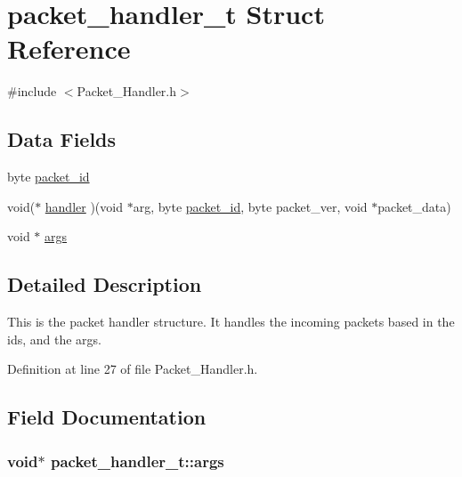 \hypertarget{structpacket__handler__t}{\section{packet\-\_\-handler\-\_\-t Struct Reference}
\label{structpacket__handler__t}
}


{\ttfamily \#include $<$Packet\-\_\-\-Handler.\-h$>$}

\subsection*{Data Fields}
\begin{DoxyCompactItemize}
\item 
byte \hyperlink{structpacket__handler__t_a10a32700326ae2f81e895e7fdc82f275}{packet\-\_\-id}
\item 
void($\ast$ \hyperlink{structpacket__handler__t_a0e7868fbcc975c2bc313652986091b1c}{handler} )(void $\ast$arg, byte \hyperlink{structpacket__handler__t_a10a32700326ae2f81e895e7fdc82f275}{packet\-\_\-id}, byte packet\-\_\-ver, void $\ast$packet\-\_\-data)
\item 
void $\ast$ \hyperlink{structpacket__handler__t_a348bd808dfafc0d6b2e429b2a7ee1ee3}{args}
\end{DoxyCompactItemize}


\subsection{Detailed Description}
This is the packet handler structure. It handles the incoming packets based in the ids, and the args. 

Definition at line 27 of file Packet\-\_\-\-Handler.\-h.



\subsection{Field Documentation}
\hypertarget{structpacket__handler__t_a348bd808dfafc0d6b2e429b2a7ee1ee3}{
\subsubsection[{args}]{\setlength{\rightskip}{0pt plus 5cm}void$\ast$ packet\-\_\-handler\-\_\-t\-::args}}\label{structpacket__handler__t_a348bd808dfafc0d6b2e429b2a7ee1ee3}


